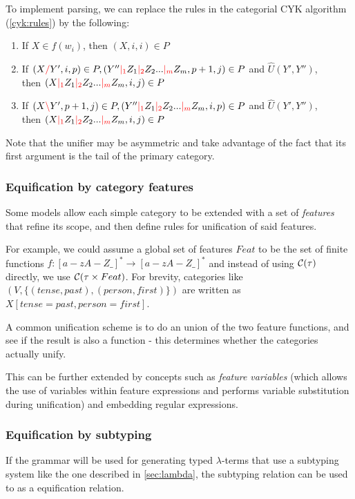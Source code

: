 \documentclass[main.tex]{subfiles}
\begin{document}
To implement parsing, we can replace the rules in the categorial CYK algorithm 
(\cref{cyk:rules}) by the following:

\begin{enumerate}
    \item If $X \in f(w_i)$, then $(X, i, i) \in P$
    \item If $(X \textcolor{red}{/} Y', i, p) \in P, (Y'' \textcolor{red}{|_{1}} Z_1 \textcolor{red}{|_{2}} Z_2 ... \textcolor{red}{|_{m}} Z_m, p + 1, j) \in P$
        and $\hat{U}(Y', Y'')$, \\
        then $(X \textcolor{red}{|_{1}} Z_1 \textcolor{red}{|_{2}} Z_2 ... \textcolor{red}{|_{m}} Z_m, i, j) \in P$
    \item If $(X \textcolor{red}{\backslash} Y', p + 1, j) \in P, (Y'' \textcolor{red}{|_{1}} Z_1 \textcolor{red}{|_{2}} Z_2 ... \textcolor{red}{|_{m}} Z_m, i, p) \in P$
        and $\hat{U}(Y', Y'')$, \\
        then $(X \textcolor{red}{|_{1}} Z_1 \textcolor{red}{|_{2}} Z_2 ... \textcolor{red}{|_{m}} Z_m, i, j) \in P$
\end{enumerate}

Note that the unifier may be asymmetric and take advantage of the fact
that its first argument is the tail of the primary category.

\subsubsection{Equification by category features}
Some models allow each simple category to be extended with a set of \emph{features}
that refine its scope, and then define rules for unification of said features.

For example, we could assume a global set of features $Feat$ to be the
set of finite functions $f: [a-zA-Z\_]^* \rightarrow [a-zA-Z\_]^*$
and instead of using $\mathcal{C}( \tau )$ directly, we use $\mathcal{C}( \tau \times Feat )$.
For brevity, categories like $(V, \{ (tense, past), (person, first) \})$
are written as $X[tense=past, person=first]$.

A common unification scheme is to do an union of the two feature functions,
and see if the result is also a function - this determines whether the
categories actually unify.

This can be further extended by concepts such as \emph{feature variables}
(which allows the use of variables within feature expressions and
performs variable substitution during unification) and embedding regular expressions.

\subsubsection{Equification by subtyping}\label{hack:subtyping}
If the grammar will be used for generating typed $\lambda$-terms that use
a subtyping system like the one described in \cref{sec:lambda}, the subtyping
relation can be used to as a equification relation.
\end{document}
